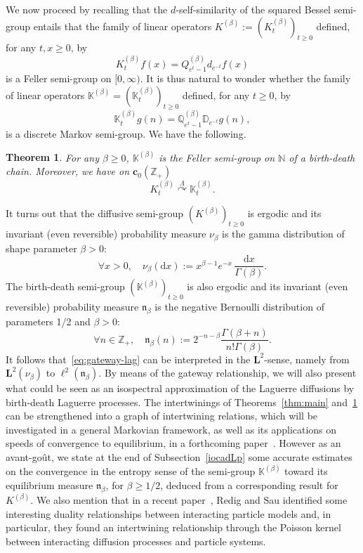 \documentclass[10pt]{amsart}
\newtheorem{theo}{Theorem}[section]
\theoremstyle{definition}\newtheorem{defi}[theo]{Definition}\newtheorem{rema}[theo]{Remark}\newtheorem{exam}[theo]{Example}\newtheorem{exem}[theo]{Example}\newtheorem{nota}[theo]{Notation}
\newcommand{\df}{\mathrel{:=}}
\newcommand{\ZZ}{\mathbb{Z}}
\newcommand{\fn}{\mathfrak{n}}
\newcommand{\dLs}{{\discret{K}}}
\newcommand{\Ls}{K}
\newcommand{\esL}{\mathbf{L}}
\newcommand{\esc}{\mathbf{c}}
\newcommand*\N{{\mathbb N}}
\newcommand{\discret}[1]{\mathds{#1}}
\newcommand{\cont}[1]{{#1}}
\newcommand{\Gate}[3]{#1\stackrel{#2}{\curvearrowright}#3}
\let\oldforall\forall
\renewcommand*{\forall}{\mathrel{\oldforall}}
\newcommand*{\dd}{\mathrm{d}}
\newcommand*{\dx}{\dd x}
\begin{document}
We now proceed by recalling that the $\cont{d}$-self-similarity of the squared Bessel semi-group entails that the family of linear operators $\cont{K}^{(\beta)}\df(\cont{K}^{(\beta)}_t)_{t\geq 0}$ defined, for any $t,x\geq 0$, by
\begin{equation*}
\cont{K}^{(\beta)}_t f(x) = \cont{Q}^{(\beta)}_{e^t-1} \cont{d}_{e^{-t}}f(x)
\end{equation*}
is a Feller semi-group on $[0,\infty)$. It is thus natural to wonder whether the family of linear operators $\discret{K}^{(\beta)}=(\discret{K}^{(\beta)}_t)_{t\geq 0}$ defined, for any $t\geq 0$, by
\begin{equation*}
\discret{K}^{(\beta)}_t g(n) = \discret{Q}^{(\beta)}_{e^t-1} \discret{D}_{e^{-t}}g(n),
\end{equation*}
is a discrete Markov semi-group. We have the following.

\begin{theo}\label{thm:mainK}
For any $\beta\geq 0$, $\discret{K}^{(\beta)}$ is the Feller semi-group on $\N$ of a birth-death chain. Moreover, we have on $\esc_0(\ZZ_+)$
\begin{equation}\label{eq:gateway-lag}
\Gate{\cont{K}_t^{(\beta)}}{\Lambda}{\discret{K}_t^{(\beta)}}.
\end{equation}
\end{theo}

It turns out that the diffusive semi-group $(\Ls^{(\beta)})_{t\geq 0}$ is ergodic and its invariant (even reversible) probability measure $\nu_\beta$ is the gamma distribution of shape parameter $\beta>0$:
\[
\forall x>0,\quad\nu_\beta(\dx)\df x^{\beta-1}e^{-x}\, \frac{\dx}{\Gamma(\beta)}.
\]
The birth-death semi-group $(\dLs^{(\beta)})_{t\geq 0}$ is also ergodic and its invariant (even reversible) probability measure $\fn_\beta$ is the negative Bernoulli distribution of parameters 1/2 and $\beta>0$:
\[
\forall n\in\ZZ_+,\quad \fn_\beta(n)\df 2^{-n-\beta}\frac{\Gamma(\beta+n)}{n!\Gamma(\beta)}.
\]
It follows that~\eqref{eq:gateway-lag} can be interpreted in the $\esL^2$-sense, namely from $\esL^2(\nu_\beta)$ to $\ell^2(\fn_\beta)$. By means of the gateway relationship, we will also present what could be seen as an isospectral approximation of the Laguerre diffusions by birth-death Laguerre processes. The intertwinings of Theorems~\ref{thm:main} and~\ref{thm:mainK} can be strengthened into a graph of intertwining relations, which will be investigated in a general Markovian framework, as well as its applications on speeds of convergence to equilibrium, in a forthcoming paper~\cite{intertwining}. However as an avant-go\^ut, we state at the end of Subsection~\ref{iocadLp} some accurate estimates on the convergence in the entropy sense of the semi-group $\dLs^{(\beta)}$ toward its equilibrium measure $\fn_\beta$, for $\beta\geq 1/2$, deduced from a corresponding result for $\Ls^{(\beta)}$. We also mention that in a recent paper~\cite{Redig}, Redig and Sau identified some interesting duality relationships between interacting particle models and, in particular, they found an intertwining relationship through the Poisson kernel between interacting diffusion processes and particle systems.
\end{document}
